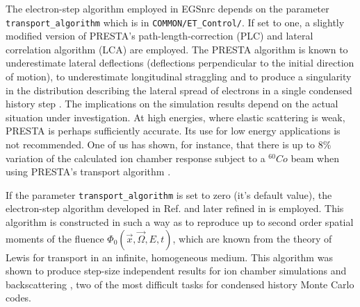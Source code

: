 The electron-step algorithm employed in EGSnrc depends
on the parameter {\tt trans\-port\_algo\-rithm} which
is in {\tt COMMON/ET\_Control/}. If set
to one, a slightly modified version of
PRESTA's \cite{BR87} path-length-correction (PLC)
and lateral correlation algorithm (LCA) are employed.
The PRESTA algorithm is known to underestimate
lateral deflections (deflections perpendicular to the
initial direction of motion), to underestimate
longitudinal straggling and to produce a singularity
in the distribution describing the lateral spread of electrons
in a single condensed history step \cite{Ka96b,KB97a}.
The implications on the simulation results depend on
the actual situation under investigation. At high energies,
where elastic scattering is weak, PRESTA is perhaps sufficiently
accurate. Its use for low energy applications is not
recommended. One of us has shown, for instance, that
there is up to 8\% variation of the calculated ion chamber
response subject to a $^{60}Co$ beam when using PRESTA's
transport algorithm \cite{Ka99b}.

If the parameter {\tt trans\-port\_algo\-rithm} is set to zero
(it's default value), the electron-step algorithm
developed in Ref. \cite{KB97a} and later refined in
\cite{Ka99a} is employed. This algorithm is constructed
in such a way as to reproduce up to second order spatial moments
of the fluence $\Phi_0(\vec{x},\vec{\Omega},E,t)$, which
are known from the theory of Lewis \cite{Le50} for
transport in an infinite, homogeneous medium. This algorithm
was shown to produce step-size independent results for
ion chamber simulations and backscattering \cite{Ka99a,Ka99b}, two of the
most difficult tasks for condensed history Monte Carlo codes.

